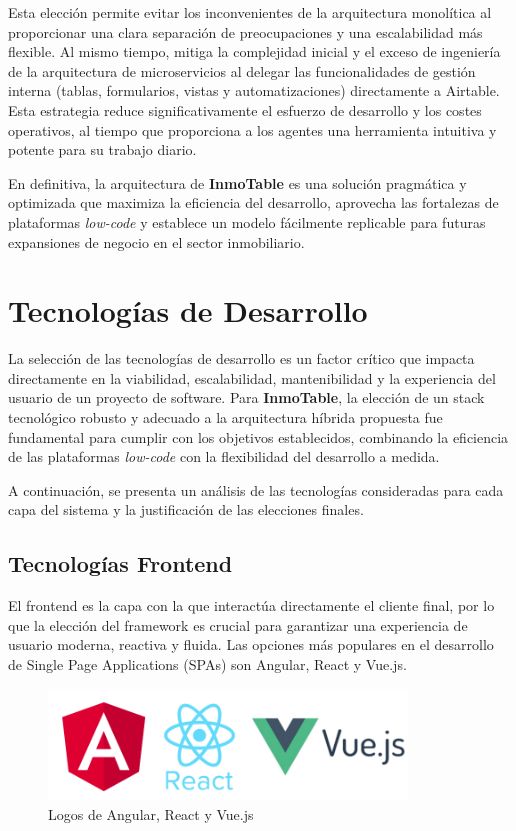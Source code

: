 Esta elección permite evitar los inconvenientes de la arquitectura monolítica al proporcionar una clara separación de preocupaciones y una escalabilidad más flexible. Al mismo tiempo, mitiga la complejidad inicial y el exceso de ingeniería de la arquitectura de microservicios al delegar las funcionalidades de gestión interna (tablas, formularios, vistas y automatizaciones) directamente a Airtable. Esta estrategia reduce significativamente el esfuerzo de desarrollo y los costes operativos, al tiempo que proporciona a los agentes una herramienta intuitiva y potente para su trabajo diario.

En definitiva, la arquitectura de \textbf{InmoTable} es una solución pragmática y optimizada que maximiza la eficiencia del desarrollo, aprovecha las fortalezas de plataformas \textit{low-code} y establece un modelo fácilmente replicable para futuras expansiones de negocio en el sector inmobiliario.


\section{Tecnologías de Desarrollo}


La selección de las tecnologías de desarrollo es un factor crítico que impacta directamente en la viabilidad, escalabilidad, mantenibilidad y la experiencia del usuario de un proyecto de software. Para \textbf{InmoTable}, la elección de un stack tecnológico robusto y adecuado a la arquitectura híbrida propuesta fue fundamental para cumplir con los objetivos establecidos, combinando la eficiencia de las plataformas \textit{low-code} con la flexibilidad del desarrollo a medida.

A continuación, se presenta un análisis de las tecnologías consideradas para cada capa del sistema y la justificación de las elecciones finales.


\subsection{Tecnologías Frontend}


El frontend es la capa con la que interactúa directamente el cliente final, por lo que la elección del framework es crucial para garantizar una experiencia de usuario moderna, reactiva y fluida. Las opciones más populares en el desarrollo de Single Page Applications (SPAs) son Angular, React y Vue.js.

\begin{figure}[H]
    \begin{center}
        \includegraphics[width = 0.85\textwidth]{Figuras/logoangularreactvuejs.png}
    \end{center}
    \caption{\label{fig:logoangularreactvuejs} Logos de Angular, React y Vue.js}
\end{figure}

